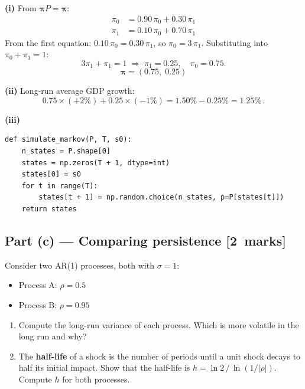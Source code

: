 \documentclass[11pt,a4paper]{article}
\newcommand{\mkpts}[1]{\hfill\textbf{[#1~marks]}}
\begin{document}
\begin{solution}
\textbf{(i)} From $\boldsymbol{\pi}P = \boldsymbol{\pi}$:
\begin{align*}
\pi_0 &= 0.90\,\pi_0 + 0.30\,\pi_1 \\
\pi_1 &= 0.10\,\pi_0 + 0.70\,\pi_1
\end{align*}
From the first equation: $0.10\,\pi_0 = 0.30\,\pi_1$, so $\pi_0 = 3\,\pi_1$.  Substituting into $\pi_0 + \pi_1 = 1$:
\[
3\pi_1 + \pi_1 = 1 \;\Longrightarrow\; \pi_1 = 0.25, \quad \pi_0 = 0.75.
\]
\[
\boxed{\boldsymbol{\pi} = (0.75,\; 0.25)}
\]

\textbf{(ii)} Long-run average GDP growth:
\[
0.75 \times (+2\%) + 0.25 \times (-1\%) = 1.50\% - 0.25\% = \boxed{1.25\%}\,.
\]

\textbf{(iii)}
\begin{lstlisting}[numbers=none]
def simulate_markov(P, T, s0):
    n_states = P.shape[0]
    states = np.zeros(T + 1, dtype=int)
    states[0] = s0
    for t in range(T):
        states[t + 1] = np.random.choice(n_states, p=P[states[t]])
    return states
\end{lstlisting}
\end{solution}

\subsection*{Part (c) --- Comparing persistence \mkpts{2}}

Consider two AR(1) processes, both with $\sigma=1$:
\begin{itemize}[nosep]
\item Process A: $\rho = 0.5$
\item Process B: $\rho = 0.95$
\end{itemize}

\begin{enumerate}[label=(\roman*),nosep]
\item Compute the long-run variance of each process.  Which is more volatile in the long run and why?
\item The \textbf{half-life} of a shock is the number of periods until a unit shock decays to half its initial impact.  Show that the half-life is $h = \ln 2 \,/\, \ln(1/|\rho|)$.  Compute $h$ for both processes.
\end{enumerate}
\end{document}
